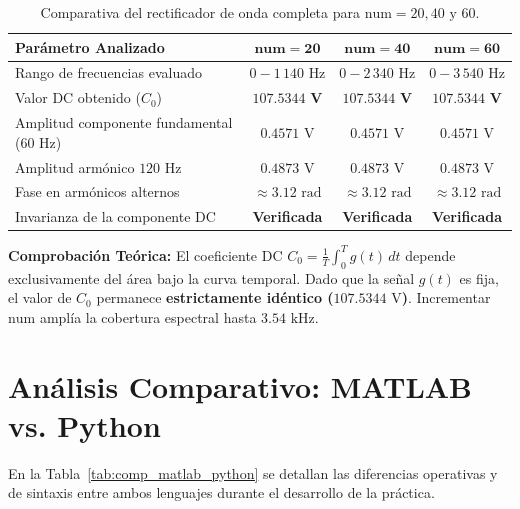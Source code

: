 \documentclass[11pt,a4paper]{article}
\begin{document}
\begin{table}[H]
\centering
\caption{Comparativa del rectificador de onda completa para $\text{num} = 20, 40 \text{ y } 60$.}
\label{tab:comp_rect}
\begin{tabular}{lccc}
\toprule
\textbf{Parámetro Analizado} & $\mathbf{num = 20}$ & $\mathbf{num = 40}$ & $\mathbf{num = 60}$ \\
\midrule
Rango de frecuencias evaluado & $0 - 1\,140\text{ Hz}$ & $0 - 2\,340\text{ Hz}$ & $0 - 3\,540\text{ Hz}$ \\
Valor DC obtenido ($C_0$) & $\mathbf{107.5344\text{ V}}$ & $\mathbf{107.5344\text{ V}}$ & $\mathbf{107.5344\text{ V}}$ \\
Amplitud componente fundamental ($60\text{ Hz}$) & $0.4571\text{ V}$ & $0.4571\text{ V}$ & $0.4571\text{ V}$ \\
Amplitud armónico $120\text{ Hz}$ & $0.4873\text{ V}$ & $0.4873\text{ V}$ & $0.4873\text{ V}$ \\
Fase en armónicos alternos & $\approx 3.12\text{ rad}$ & $\approx 3.12\text{ rad}$ & $\approx 3.12\text{ rad}$ \\
Invarianza de la componente DC & \textbf{Verificada} & \textbf{Verificada} & \textbf{Verificada} \\
\bottomrule
\end{tabular}
\end{table}

\noindent\textbf{Comprobación Teórica:} El coeficiente DC $C_0 = \frac{1}{T}\int_0^T g(t)\, dt$ depende exclusivamente del área bajo la curva temporal. Dado que la señal $g(t)$ es fija, el valor de $C_0$ permanece \textbf{estrictamente idéntico ($107.5344\text{ V}$)}. Incrementar $\text{num}$ amplía la cobertura espectral hasta $3.54\text{ kHz}$.

\section{Análisis Comparativo: MATLAB vs. Python}
En la Tabla~\ref{tab:comp_matlab_python} se detallan las diferencias operativas y de sintaxis entre ambos lenguajes durante el desarrollo de la práctica.
\end{document}
